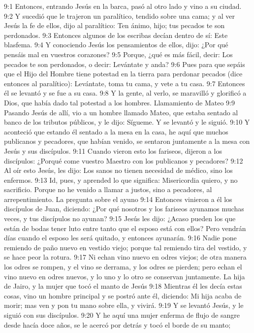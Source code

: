 9:1 Entonces, entrando Jesús en la barca, pasó al otro lado y vino a su ciudad. 
9:2 Y sucedió que le trajeron un paralítico, tendido sobre una cama; y al ver Jesús la fe de ellos, dijo al paralítico: Ten ánimo, hijo; tus pecados te son perdonados. 
9:3 Entonces algunos de los escribas decían dentro de sí: Este blasfema. 
9:4 Y conociendo Jesús los pensamientos de ellos, dijo: ¿Por qué pensáis mal en vuestros corazones? 
9:5 Porque, ¿qué es más fácil, decir: Los pecados te son perdonados, o decir: Levántate y anda? 
9:6 Pues para que sepáis que el Hijo del Hombre tiene potestad en la tierra para perdonar pecados (dice entonces al paralítico): Levántate, toma tu cama, y vete a tu casa. 
9:7 Entonces él se levantó y se fue a su casa. 
9:8 Y la gente, al verlo, se maravilló y glorificó a Dios, que había dado tal potestad a los hombres. 
Llamamiento de Mateo  
9:9 Pasando Jesús de allí, vio a un hombre llamado Mateo, que estaba sentado al banco de los tributos públicos, y le dijo: Sígueme. Y se levantó y le siguió. 
9:10 Y aconteció que estando él sentado a la mesa en la casa, he aquí que muchos publicanos y pecadores, que habían venido, se sentaron juntamente a la mesa con Jesús y sus discípulos. 
9:11 Cuando vieron esto los fariseos, dijeron a los discípulos: ¿Porqué come vuestro Maestro con los publicanos y pecadores? 
9:12 Al oír esto Jesús, les dijo: Los sanos no tienen necesidad de médico, sino los enfermos. 
9:13 Id, pues, y aprended lo que significa:  Misericordia quiero, y no sacrificio. Porque no he venido a llamar a justos, sino a pecadores, al arrepentimiento. 
La pregunta sobre el ayuno  
9:14 Entonces vinieron a él los discípulos de Juan, diciendo: ¿Por qué nosotros y los fariseos ayunamos muchas veces, y tus discípulos no ayunan? 
9:15 Jesús les dijo: ¿Acaso pueden los que están de bodas tener luto entre tanto que el esposo está con ellos? Pero vendrán días cuando el esposo les será quitado, y entonces ayunarán. 
9:16 Nadie pone remiendo de paño nuevo en vestido viejo; porque tal remiendo tira del vestido, y se hace peor la rotura. 
9:17 Ni echan vino nuevo en odres viejos; de otra manera los odres se rompen, y el vino se derrama, y los odres se pierden; pero echan el vino nuevo en odres nuevos, y lo uno y lo otro se conservan juntamente. 
La hija de Jairo, y la mujer que tocó el manto de Jesús  
9:18 Mientras él les decía estas cosas, vino un hombre principal y se postró ante él, diciendo: Mi hija acaba de morir; mas ven y pon tu mano sobre ella, y vivirá. 
9:19 Y se levantó Jesús, y le siguió con sus discípulos. 
9:20 Y he aquí una mujer enferma de flujo de sangre desde hacía doce años, se le acercó por detrás y tocó el borde de su manto; 
